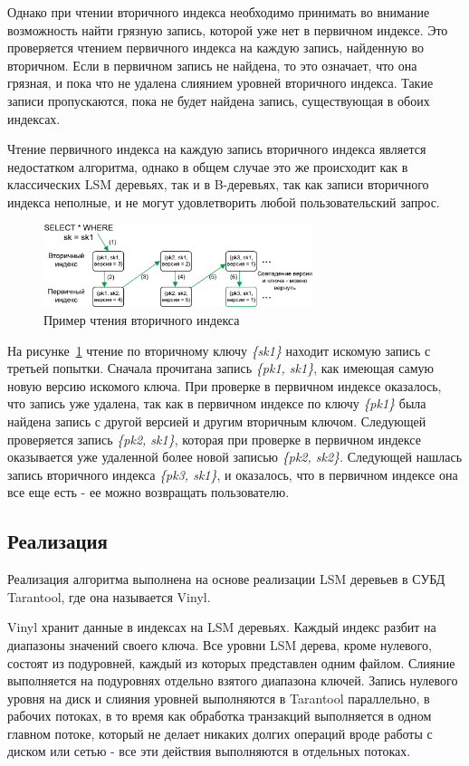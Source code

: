 \documentclass[a4paper,hidelinks,12pt]{article}
\begin{document}
Однако при чтении вторичного индекса необходимо принимать во внимание
возможность найти грязную запись, которой уже нет в первичном индексе. Это
проверяется чтением первичного индекса на каждую запись, найденную во вторичном.
Если в первичном запись не найдена, то это означает, что она грязная, и пока что
не удалена слиянием уровней вторичного индекса. Такие записи пропускаются, пока
не будет найдена запись, существующая в обоих индексах.

Чтение первичного индекса на каждую запись вторичного индекса является
недостатком алгоритма, однако в общем случае это же происходит как в
классических LSM деревьях, так и в B-деревьях, так как записи вторичного индекса
неполные, и не могут удовлетворить любой пользовательский запрос.

\begin{figure}[h]
\centering
\includegraphics[width=0.7\textwidth]{secondary_reading_example}
\caption{Пример чтения вторичного индекса}
\label{fig:secondary_reading_example}
\end{figure}

На рисунке~\ref{fig:secondary_reading_example} чтение по вторичному ключу
\textit{\{sk1\}} находит искомую запись с третьей попытки. Сначала прочитана
запись \textit{\{pk1, sk1\}}, как имеющая самую новую версию искомого ключа.
При проверке в первичном индексе оказалось, что запись уже удалена, так как в
первичном индексе по ключу \textit{\{pk1\}} была найдена запись с другой версией
и другим вторичным ключом. Следующей проверяется запись \textit{\{pk2, sk1\}},
которая при проверке в первичном индексе оказывается уже удаленной более новой
записью \textit{\{pk2, sk2\}}. Следующей нашлась запись вторичного индекса
\textit{\{pk3, sk1\}}, и оказалось, что в первичном индексе она все еще есть -
ее можно возвращать пользователю.

\subsection{Реализация}
Реализация алгоритма выполнена на основе реализации LSM деревьев в СУБД
Tarantool, где она называется Vinyl.

Vinyl хранит данные в индексах на LSM деревьях. Каждый индекс разбит на
диапазоны значений своего ключа. Все уровни LSM дерева, кроме нулевого, состоят
из подуровней, каждый из которых представлен одним файлом. Слияние выполняется
на подуровнях отдельно взятого диапазона ключей. Запись нулевого уровня на диск
и слияния уровней выполняются в Tarantool параллельно, в рабочих потоках, в то
время как обработка транзакций выполняется в одном главном потоке, который не
делает никаких долгих операций вроде работы с диском или сетью - все эти
действия выполняются в отдельных потоках.
\end{document}
